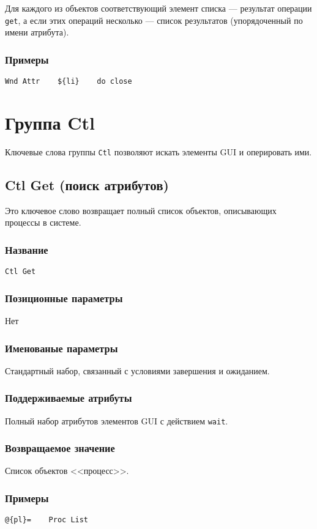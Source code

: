 \documentclass[11pt]{book} %
\begin{document}
Для каждого из объектов соответствующий элемент списка --- результат операции \verb|get|, а если этих операций несколько --- список результатов (упорядоченный по имени атрибута).

\subsubsection*{Примеры}
\begin{verbatim}Wnd Attr    ${li}    do close\end{verbatim}





\section{Группа Ctl}
Ключевые слова группы \verb"Ctl" позволяют искать элементы GUI и оперировать ими.

\subsection{Ctl Get (поиск атрибутов)}
Это ключевое слово возвращает полный список объектов, описывающих процессы в системе.


\subsubsection*{Название} 
\verb"Ctl Get"

\subsubsection*{Позиционные параметры} 
Нет

\subsubsection*{Именованые параметры}

Стандартный набор, связанный с условиями завершения и ожиданием.

\subsubsection*{Поддерживаемые атрибуты} 

Полный набор атрибутов элементов GUI с действием \verb|wait|.

\subsubsection*{Возвращаемое значение} 
Список объектов <<процесс>>.

\subsubsection*{Примеры}
\begin{verbatim}@{pl}=    Proc List\end{verbatim}
\end{document}
